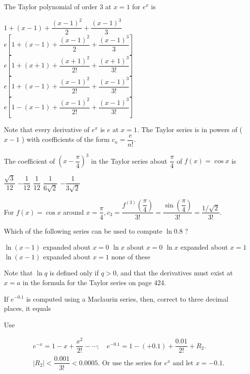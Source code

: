 \question
The Taylor polynomial of order 3 at $x=1$ for $e^{x}$ is
\begin{choices}
  \choice $1+(x-1)+\dfrac{(x-1)^{2}}{2}+\dfrac{(x-1)^{3}}{3}$
  \choice $e\left[1+(x-1)+\dfrac{(x-1)^{2}}{2}+\dfrac{(x-1)^{3}}{3}\right]$
  \choice $e\left[1+(x+1)+\dfrac{(x+1)^{2}}{2!}+\dfrac{(x+1)^{3}}{3!}\right]$
  \CorrectChoice $e\left[1+(x-1)+\dfrac{(x-1)^{2}}{2!}+\dfrac{(x-1)^{3}}{3!}\right]$
  \choice $e\left[1-(x-1)+\dfrac{(x-1)^{2}}{2!}+\dfrac{(x-1)^{3}}{3!}\right]$
\end{choices}
\begin{solution}
Note that every derivative of $e^{x}$ is $e$ at $x=1$. The Taylor series is in powers of ( $x-1$ ) with coefficients of the form $c_{n}=\dfrac{e}{n!}$.
\end{solution}

\question
The coefficient of $\left(x-\dfrac{\pi}{4}\right)^{3}$ in the Taylor series about $\dfrac{\pi}{4}$ of $f(x)=\cos x$ is
\begin{choices}
  \choice $\dfrac{\sqrt{3}}{12}$
  \choice $-\dfrac{1}{12}$
  \choice $\dfrac{1}{12}$
  \CorrectChoice $\dfrac{1}{6 \sqrt{2}}$
  \choice $-\dfrac{1}{3 \sqrt{2}}$
\end{choices}
\begin{solution}
For $f(x)=\cos x$ around $x=\dfrac{\pi}{4}, c_{3}=\dfrac{f^{(3)}\left(\dfrac{\pi}{4}\right)}{3!}=\dfrac{\sin \left(\dfrac{\pi}{4}\right)}{3!}=\dfrac{1 / \sqrt{2}}{3!}$.
\end{solution}



\newpage




\question
Which of the following series can be used to compute $\ln 0.8$ ?
\begin{choices}
  \choice $\ln (x-1)$ expanded about $x=0$
  \choice $\ln x$ about $x=0$
  \CorrectChoice $\ln x$ expanded about $x=1$
  \choice $\ln (x-1)$ expanded about $x=1$
  \choice none of these
\end{choices}
\begin{solution}
Note that $\ln q$ is defined only if $q>0$, and that the derivatives must exist at $x=a$ in the formula for the Taylor series on page 424.
\end{solution}

\question
If $e^{-0.1}$ is computed using a Maclaurin series, then, correct to three decimal places, it equals
\begin{choices}
\end{choices}
\begin{solution}
Use


\[
\begin{aligned}
& e^{-x}=1-x+\dfrac{x^{2}}{2!}-\cdots ; \quad e^{-0.1}=1-(+0.1)+\dfrac{0.01}{2!}+R_{2} . \\
& \left|R_{2}\right|<\dfrac{0.001}{3!}<0.0005 . \text { Or use the series for } e^{x} \text { and let } x=-0.1 .
\end{aligned}
\]


\end{solution}

